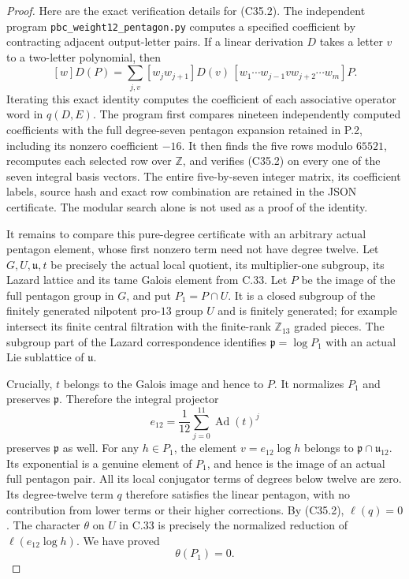 \begin{proof}
Here are the exact verification details for (C35.2).
The independent program \texttt{pbc\_weight12\_pentagon.py}
computes a specified coefficient by contracting adjacent
output-letter pairs.  If a linear derivation $D$ takes
a letter $v$ to a two-letter polynomial, then
\[
 [w]D(P)=
 \sum_{j,v}[w_jw_{j+1}]D(v)\,
       [w_1\cdots w_{j-1}v w_{j+2}\cdots w_m]P.                 \tag{C35.3}
\]
Iterating this exact identity computes the coefficient
of each associative operator word in $q(D,E)$.
The program first compares nineteen independently
computed coefficients with the full degree-seven
pentagon expansion retained in P.2, including its
nonzero coefficient $-16$.  It then finds the five
rows modulo $65521$, recomputes each selected row
over $\mathbb Z$, and verifies (C35.2) on every one
of the seven integral basis vectors.
The entire five-by-seven integer matrix, its coefficient
labels, source hash and exact row combination are retained
in the JSON certificate.  The modular search alone is
not used as a proof of the identity.

It remains to compare this pure-degree certificate with
an arbitrary actual pentagon element, whose first nonzero
term need not have degree twelve.
Let $G,U,\mathfrak u,t$ be precisely the actual local
quotient, its multiplier-one subgroup, its Lazard lattice
and its tame Galois element from C.33.
Let $P$ be the image of the full pentagon group in $G$,
and put $P_1=P\cap U$.
It is a closed subgroup of the finitely generated
nilpotent pro-$13$ group $U$ and is finitely generated;
for example intersect its finite central filtration
with the finite-rank $\mathbb Z_{13}$ graded pieces.
The subgroup part of the Lazard correspondence identifies
$\mathfrak p=\log P_1$ with an actual Lie sublattice of
$\mathfrak u$.

Crucially, $t$ belongs to the Galois image and hence to
$P$.  It normalizes $P_1$ and preserves $\mathfrak p$.
Therefore the integral projector
\[
                     e_{12}=\frac1{12}
                         \sum_{j=0}^{11}\operatorname{Ad}(t)^j
                                                               \tag{C35.4}
\]
preserves $\mathfrak p$ as well.
For any $h\in P_1$, the element
$v=e_{12}\log h$ belongs to
$\mathfrak p\cap\mathfrak u_{12}$.
Its exponential is a genuine element of $P_1$,
and hence is the image of an actual full pentagon pair.
All its local conjugator terms of degrees below twelve
are zero.  Its degree-twelve term $q$ therefore satisfies
the linear pentagon, with no contribution from lower
terms or their higher corrections.
By (C35.2), $\ell(q)=0$.
The character $\theta$ on $U$ in C.33 is precisely the
normalized reduction of $\ell(e_{12}\log h)$.
We have proved
\[
                             \theta(P_1)=0.                    \tag{C35.5}
\]


\end{proof}

